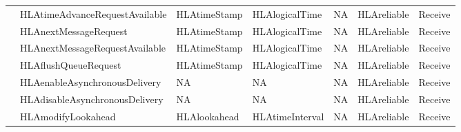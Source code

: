 \begin{landscape}
\begin{momtabletypeset}[8.00]
{{\begin{tabular}{|Y{116.92pt}|Y{137.54pt}|Y{76.22pt}|Y{103.88pt}|Y{65.90pt}|Y{66.32pt}|Y{38.52pt}|}
                    & HLAtimeAdvanceRequestAvailable                          & HLAtimeStamp        & HLAlogicalTime        & NA & HLAreliable & Receive \\
                    & HLAnextMessageRequest                                   & HLAtimeStamp        & HLAlogicalTime        & NA & HLAreliable & Receive \\
                    & HLAnextMessageRequestAvailable                          & HLAtimeStamp        & HLAlogicalTime        & NA & HLAreliable & Receive \\
                    & HLAflushQueueRequest                                    & HLAtimeStamp        & HLAlogicalTime        & NA & HLAreliable & Receive \\
                    & HLAenableAsynchronousDelivery                           & NA                  & NA                    & NA & HLAreliable & Receive \\
                    & HLAdisableAsynchronousDelivery                          & NA                  & NA                    & NA & HLAreliable & Receive \\
                    & HLAmodifyLookahead                                      & HLAlookahead        & HLAtimeInterval       & NA & HLAreliable & Receive \\
                    \hline
                \end{tabular}%
            }%
        }%
    \end{momtabletypeset}
    \newpage


\end{landscape}
